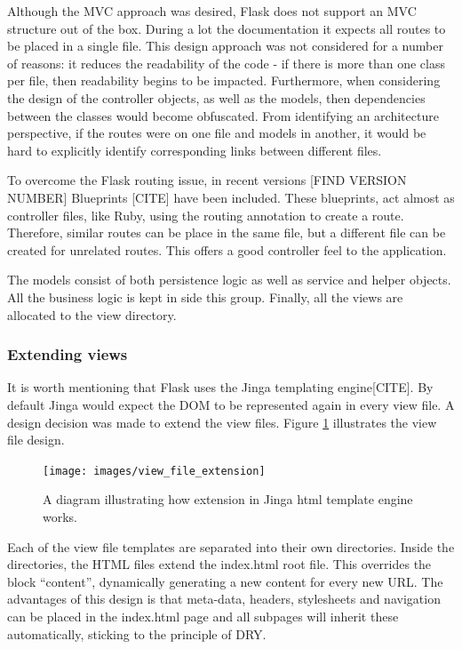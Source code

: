 Although the MVC approach was desired, Flask does not support an MVC structure out of the box. During a lot the documentation it expects all routes to be placed in a single file. This design approach was not considered for a number of reasons: it reduces the readability of the code - if there is more than one class per file, then readability begins to be impacted. Furthermore, when considering the design of the controller objects, as well as the models, then dependencies between the classes would become obfuscated. From identifying an architecture perspective, if the routes were on one file and models in another, it would be hard to explicitly identify corresponding links between different files.

To overcome the Flask routing issue, in recent versions [FIND VERSION NUMBER] Blueprints [CITE] have been included. These blueprints, act almost as controller files, like Ruby, using the routing annotation to create a route. Therefore, similar routes can be place in the same file, but a different file can be created for unrelated routes. This offers a good controller feel to the application.

The models consist of both persistence logic as well as service and helper objects. All the business logic is kept in side this group. Finally, all the views are allocated to the view directory.

\subsubsection{Extending views}
It is worth mentioning that Flask uses the Jinga templating engine[CITE]. By default Jinga would expect the DOM to be represented again in every view file. A design decision was made to extend the view files. Figure \ref{fig:extension} illustrates the view file design.
\begin{figure}[h]
  \centering
  \texttt{[image: images/view\_file\_extension]}
  \caption{A diagram illustrating how extension in Jinga html template engine works.}
  \label{fig:extension}
\end{figure}

Each of the view file templates are separated into their own directories. Inside the directories, the HTML files extend the index.html root file. This overrides the block ``content'', dynamically generating a new content for every new URL. The advantages of this design is that meta-data, headers, stylesheets and navigation can be placed in the index.html page and all subpages will inherit these automatically, sticking to the principle of DRY.


